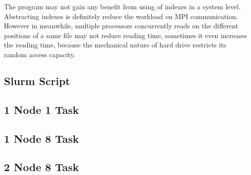 \documentclass[11pt]{article}
\begin{document}
The program may not gain any benefit from using of indexes in a system level. Abstracting indexes is definitely reduce the workload on MPI communication. However in meanwhile, multiple processors concurrently reads on the different positions of a same file may not reduce reading time, sometimes it even increases the reading time, because the mechanical nature of hard drive restricts its random access capacity. 


\begin{appendices}
\appendixpage
\section{Slurm Script}
\subsection{1 Node 1 Task}

\subsection{1 Node 8 Task}

\subsection{2 Node 8 Task}

\end{appendices}
\end{document}
